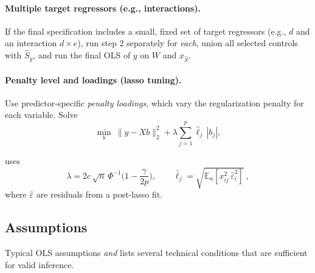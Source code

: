 \paragraph{Multiple target regressors (e.g., interactions).}
If the final specification includes a small, fixed set of target regressors (e.g., $d$ and an interaction $d\times e$), run step 2 separately for \emph{each}, 
union all selected controls with $\widehat S_y$, and run the final OLS of $y$ on $W$ and $x_{\widehat S}$.

\paragraph{Penalty level and loadings (lasso tuning).}
Use predictor-specific \emph{penalty loadings}, which vary the regularization penalty for each variable. Solve
\[
\min_b\  \|y-Xb\|_2^2 + \lambda \sum_{j=1}^p \hat\ell_j\,|b_j|,
\]

\cite{belloni2014inference} uses
\[
\lambda = 2c\,\sqrt{n}\,\Phi^{-1}\!\Big(1-\frac{\gamma}{2p}\Big),\qquad
\hat\ell_j = \sqrt{\mathbb{E}_n[x_{ij}^2\,\hat\varepsilon_i^2]}\ ,
\]
where $\hat\varepsilon$ are residuals from a post-lasso fit.

\subsection*{Assumptions}


Typical OLS assumptions \emph{and} \cite{belloni2014inference} lists several technical conditions that are sufficient for valid inference. 

